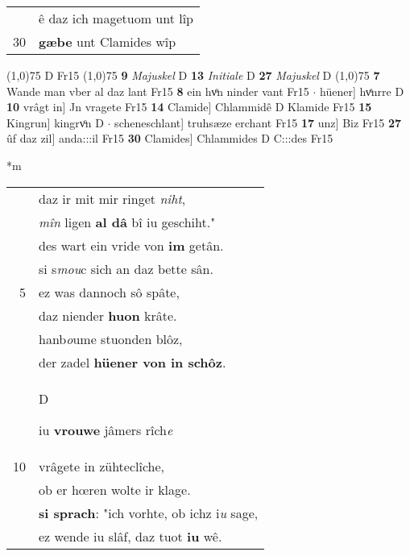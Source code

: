 \documentclass[8pt,a4paper,notitlepage]{article}
\begin{document}
\begin{table}[ht]
\begin{minipage}[t]{0.5\linewidth}
\begin{tabular}{rl}
 & ê daz ich magetuom unt lîp\\ 
30 & \textbf{gæbe} unt Clamides wîp\\ 
\end{tabular}
\scriptsize
\line(1,0){75} \newline
D Fr15 \newline
\line(1,0){75} \newline
\textbf{9} \textit{Majuskel} D  \textbf{13} \textit{Initiale} D  \textbf{27} \textit{Majuskel} D  \newline
\line(1,0){75} \newline
\textbf{7} Wande man vber al daz lant Fr15 \textbf{8} ein hvͦn ninder vant Fr15  $\cdot$ hüener] hvͤnrre D \textbf{10} vrâgt in] Jn vragete Fr15 \textbf{14} Clamide] Chlammidê D Klamide Fr15 \textbf{15} Kingrun] kingrvͦn D  $\cdot$ scheneschlant] truhsæze erchant Fr15 \textbf{17} unz] Biz Fr15 \textbf{27} ûf daz zil] anda:::il Fr15 \textbf{30} Clamides] Chlammides D C:::des Fr15 \newline
\end{minipage}
\hspace{0.5cm}
\begin{minipage}[t]{0.5\linewidth}
\small
\begin{center}*m
\end{center}
\begin{tabular}{rl}
 & daz ir mit mir ringet \textit{niht},\\ 
 & \textit{mîn} ligen \textbf{al dâ} bî iu geschiht."\\ 
 & des wart ein vride von \textbf{im} getân.\\ 
 & si s\textit{mou}c sich an daz bette sân.\\ 
5 & ez was dannoch sô spâte,\\ 
 & daz niender \textbf{huon} krâte.\\ 
 & hanb\textit{o}ume stuonden blôz,\\ 
 & der zadel \textbf{hüener von in schôz}.\\ 
 & \begin{large}D\end{large}iu \textbf{vrouwe} jâmers rîch\textit{e}\\ 
10 & vrâgete in zühteclîche,\\ 
 & ob er hœren wolte ir klage.\\ 
 & \textbf{si sprach}: "ich vorhte, ob ichz i\textit{u} sage,\\ 
 & ez wende iu slâf, daz tuot \textbf{iu} wê.\\ 

\end{tabular}
\end{minipage}
\end{table}
\end{document}
